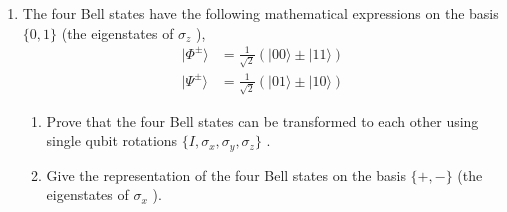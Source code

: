 \documentclass[english,aps,onecolumn]{revtex4-1}
\begin{document}
\begin{enumerate}[1.]
\item
  The four Bell states have the following mathematical expressions on the basis $\{0,1\}$ (the eigenstates of $\sigma_z$ ),
   \begin{align*}
      |\Phi^{\pm}\rangle&=\frac{1}{\sqrt{2}}(|00\rangle\pm|11\rangle)\\
      |\Psi^{\pm}\rangle&=\frac{1}{\sqrt{2}}(|01\rangle\pm|10\rangle)
    \end{align*}
 \begin{enumerate}[(1)]
 \item Prove that the four Bell states can be transformed to each other using single qubit rotations $\{I,\sigma_x,\sigma_y,\sigma_z\}$ .
 \item Give the representation of the four Bell states on the basis $\{+,-\}$ (the eigenstates of $\sigma_x$ ).
 \end{enumerate}


\end{enumerate}
\end{document}
